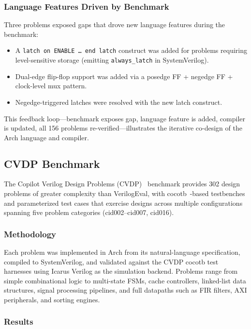 \documentclass[11pt,twocolumn]{article}
\begin{document}
\subsubsection{Language Features Driven by Benchmark}

Three problems exposed gaps that drove new language features during the benchmark:

\begin{itemize}
\item A \texttt{latch on ENABLE \ldots\ end latch} construct was added for problems requiring level-sensitive storage (emitting \texttt{always\_latch} in SystemVerilog).
\item Dual-edge flip-flop support was added via a posedge FF + negedge FF + clock-level mux pattern.
\item Negedge-triggered latches were resolved with the new latch construct.
\end{itemize}

This feedback loop---benchmark exposes gap, language feature is added, compiler is updated, all 156 problems re-verified---illustrates the iterative co-design of the Arch language and compiler.

\subsection{CVDP Benchmark}\label{sec:cvdp}

The Copilot Verilog Design Problems (CVDP)~\cite{cvdp} benchmark provides 302 design problems of greater complexity than VerilogEval, with cocotb~\cite{cocotb}-based testbenches and parameterized test cases that exercise designs across multiple configurations spanning five problem categories (cid002--cid007, cid016).

\subsubsection{Methodology}

Each problem was implemented in Arch from its natural-language specification, compiled to SystemVerilog, and validated against the CVDP cocotb test harnesses using Icarus Verilog as the simulation backend. Problems range from simple combinational logic to multi-state FSMs, cache controllers, linked-list data structures, signal processing pipelines, and full datapaths such as FIR filters, AXI peripherals, and sorting engines.

\subsubsection{Results}
\end{document}
